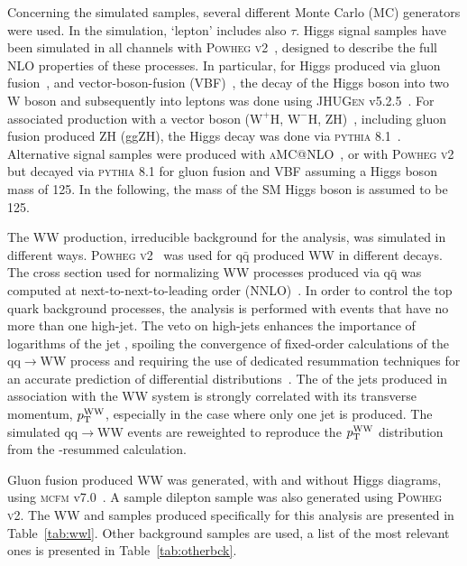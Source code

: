Concerning the simulated samples, several different Monte Carlo (MC) generators were used. 
In the simulation, `lepton' includes also $\tau$.
Higgs signal samples have been simulated in all channels with
\textsc{Powheg v2}~\cite{Nason:2004rx,Frixione:2007vw,Alioli:2010xd}, designed to describe the full NLO properties of these processes.
In particular, for Higgs produced via gluon fusion~\cite{Alioli:2008tz}, and vector-boson-fusion (VBF)~\cite{Nason:2009ai},
the decay of the Higgs boson into two W boson and subsequently into leptons was done using \textsc{JHUGen} v5.2.5~\cite{JHUGen}. 
For associated production with a vector boson ($\mathrm{W}^{+}\mathrm{H}$, $\mathrm{W}^{-}\mathrm{H}$, ZH)~\cite{Luisoni:2013kna}, including gluon fusion produced ZH (ggZH), 
the Higgs decay was done via \textsc{pythia} 8.1~\cite{Sjostrand:2007gs}.  Alternative signal samples were produced with \textsc{aMC@NLO}~\cite{Alwall:2014hca}, or  with \textsc{Powheg v2} but decayed via \textsc{pythia} 8.1 for gluon fusion and VBF assuming 
a Higgs boson mass of 125\GeV. In the following, the mass of the SM Higgs boson is assumed to be 125\GeV.

The WW production, irreducible background for the analysis, was simulated in different ways. 
\textsc{Powheg v2}~\cite{Melia:2011tj} was used for $\mathrm{q\bar q}$ produced WW in different decays. 
The cross section used for normalizing WW processes produced via $\mathrm{q\bar q}$ was computed at next-to-next-to-leading order (NNLO)~\cite{Gehrmann:2014fva}. 
In order to control the top quark background processes, the analysis is performed with events that have no more than one 
high-\pt jet. The veto on high-\pt jets enhances the importance of logarithms of the jet \pt, spoiling the convergence of 
fixed-order calculations of the qq$\rightarrow$WW process and requiring the use of dedicated resummation techniques for an
accurate prediction of differential distributions~\cite{Meade:2014fca,Jaiswal:2014yba}. 
The \pt of the jets produced in association with the WW system is strongly correlated with its transverse momentum, 
$p_\mathrm{T}^\mathrm{WW}$, especially in the case where only one jet is produced. The simulated qq$\rightarrow$WW events are reweighted  
to reproduce the $p_\mathrm{T}^\mathrm{WW}$ distribution from the \pt-resummed calculation.

Gluon fusion produced WW was generated, with and without Higgs diagrams, using \textsc{mcfm} v7.0~\cite{Campbell:2013wga}. 
A \ttbar sample dilepton sample was also generated using \textsc{Powheg v2}. The WW and \ttbar samples 
produced specifically for this analysis are presented in Table~\ref{tab:wwl}. Other background samples are used, a list of the most relevant ones is presented in Table~\ref{tab:otherbck}.

